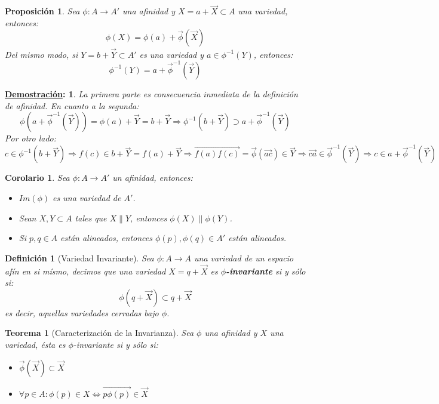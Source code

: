 \documentclass[10pt,a4paper,openright]{book}
\theoremstyle{break}
\newtheorem*{defi}{Definición}
\newtheorem*{theo}{Teorema}
\newtheorem*{coro}{Corolario}
\newtheorem*{prop}{Proposición}
\newtheorem*{demo}{\underline{Demostración}:}
\begin{document}
\begin{prop}
Sea $\phi: A \rightarrow A'$ una afinidad y $X= a + \vec{X} \subset A$ una variedad, entonces:
$$\phi(X) = \phi(a) + \vec{\phi}(\vec{X})$$
Del mismo modo, si $Y = b + \vec{Y}\subset A'$ es una variedad y $a\in \phi^{-1}(Y)$, entonces:
$$\phi^{-1}(Y) = a + \vec{\phi}^{-1}(\vec{Y})$$
\end{prop}
\begin{demo}
La primera parte es consecuencia inmediata de la definición de afinidad. En cuanto a la segunda:
$$\phi(a + \vec{\phi}^{-1}(\vec{Y})) = \phi(a) + \vec{Y} = b + \vec{Y} \Rightarrow \phi^{-1}(b + \vec{Y}) \supset a + \vec{\phi}^{-1}(\vec{Y})$$
Por otro lado:
$$c\in \phi^{-1}(b + \vec{Y}) \Rightarrow  f(c)\in  b+ \vec{Y} = f(a) + \vec{Y} \Rightarrow \overrightarrow{f(a)f(c)} = \vec{\phi}(\vec{ac})\in \vec{Y} \Rightarrow \vec{ca}\in \vec{\phi}^{-1}(\vec{Y})\Rightarrow c \in a + \vec{\phi}^{-1}(\vec{Y})$$
\end{demo}

\begin{coro}
Sea $\phi : A\rightarrow A'$ un afinidad, entonces:
\begin{itemize}
\item $Im(\phi)$ es una variedad de $A'$.
\item Sean $X,Y\subset A$ tales que $X\parallel Y$, entonces $\phi(X) \parallel \phi(Y)$.
\item Si $p,q\in A$ están alineados, entonces $\phi(p), \phi(q)\in A'$ están alineados.
\end{itemize}
\end{coro}

\begin{defi}[Variedad Invariante]
Sea $\phi : A \rightarrow A$ una variedad de un espacio afín en si mísmo, decimos que una variedad $X = q + \vec{X}$ es \textbf{$\phi$-invariante} si y sólo si:
$$\phi(q + \vec{X}) \subset q + \vec{X}$$
es decir, aquellas variedades cerradas bajo $\phi$.
\end{defi}

\begin{theo}[Caracterización de la Invarianza]
Sea $\phi$ una afinidad y $X$ una variedad, ésta es $\phi$-invariante si y sólo si:
\begin{itemize}
\item $\vec{\phi}(\vec{X})\subset \vec{X}$
\item $\forall p \in A : \phi(p)\in X \Leftrightarrow \overrightarrow{p\phi(p)}\in \vec{X}$
\end{itemize}
\end{theo}
\end{document}
